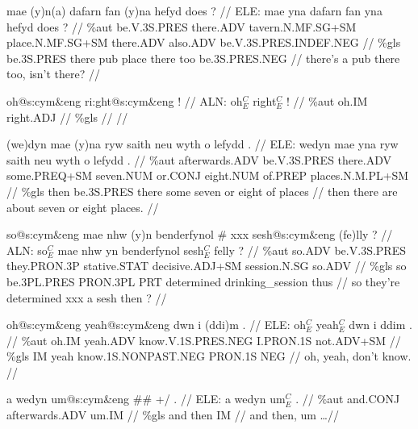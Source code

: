 \documentclass[a4paper,10pt]{article}
\begin{document}
\ex
\begingl[lingstyle=gergl]
\glchat mae (y)n(a) dafarn fan (y)na hefyd does ? //
\glsurface ELE:  mae yna dafarn fan yna hefyd does ?  //
\glauto \%aut  be{\scriptsize .V.3S.PRES} there{\scriptsize .ADV} tavern{\scriptsize .N.MF.SG+SM} place{\scriptsize .N.MF.SG+SM} there{\scriptsize .ADV} also{\scriptsize .ADV} be{\scriptsize .V.3S.PRES.INDEF.NEG}   //
\glmanual \%gls  be{\scriptsize .3S.PRES} there pub place there too be{\scriptsize .3S.PRES.NEG}   //
\gleng there's a pub there too, isn't there? //
\endgl
\xe

\ex
\begingl[lingstyle=gergl]
\glchat oh@s:cym\&eng ri:ght@s:cym\&eng ! //
\glsurface ALN:  oh$^{C}_{E}$ right$^{C}_{E}$ !  //
\glauto \%aut  oh{\scriptsize .IM} right{\scriptsize .ADJ}   //
\glmanual \%gls      //
\gleng  //
\endgl
\xe

\ex
\begingl[lingstyle=gergl]
\glchat (we)dyn mae (y)na ryw saith neu wyth o lefydd . //
\glsurface ELE:  wedyn mae yna ryw saith neu wyth o lefydd .  //
\glauto \%aut  afterwards{\scriptsize .ADV} be{\scriptsize .V.3S.PRES} there{\scriptsize .ADV} some{\scriptsize .PREQ+SM} seven{\scriptsize .NUM} or{\scriptsize .CONJ} eight{\scriptsize .NUM} of{\scriptsize .PREP} places{\scriptsize .N.M.PL+SM}   //
\glmanual \%gls  then be{\scriptsize .3S.PRES} there some seven or eight of places   //
\gleng then there are about seven or eight places. //
\endgl
\xe

\ex
\begingl[lingstyle=gergl]
\glchat so@s:cym\&eng mae nhw (y)n benderfynol \# xxx sesh@s:cym\&eng (fe)lly ? //
\glsurface ALN:  so$^{C}_{E}$ mae nhw yn benderfynol sesh$^{C}_{E}$ felly ?  //
\glauto \%aut  so{\scriptsize .ADV} be{\scriptsize .V.3S.PRES} they{\scriptsize .PRON.3P} stative{\scriptsize .STAT} decisive{\scriptsize .ADJ+SM} session{\scriptsize .N.SG} so{\scriptsize .ADV}   //
\glmanual \%gls  so be{\scriptsize .3PL.PRES} PRON{\scriptsize .3PL} PRT determined drinking\_session thus   //
\gleng so they're determined xxx a sesh then ? //
\endgl
\xe

\ex
\begingl[lingstyle=gergl]
\glchat oh@s:cym\&eng yeah@s:cym\&eng dwn i (ddi)m . //
\glsurface ELE:  oh$^{C}_{E}$ yeah$^{C}_{E}$ dwn i ddim .  //
\glauto \%aut  oh{\scriptsize .IM} yeah{\scriptsize .ADV} know{\scriptsize .V.1S.PRES.NEG} I{\scriptsize .PRON.1S} not{\scriptsize .ADV+SM}   //
\glmanual \%gls  IM yeah know{\scriptsize .1S.NONPAST.NEG} PRON{\scriptsize .1S} NEG   //
\gleng oh, yeah, don't know. //
\endgl
\xe

\ex
\begingl[lingstyle=gergl]
\glchat a wedyn um@s:cym\&eng \#\# +/ . //
\glsurface ELE:  a wedyn um$^{C}_{E}$ .  //
\glauto \%aut  and{\scriptsize .CONJ} afterwards{\scriptsize .ADV} um{\scriptsize .IM}   //
\glmanual \%gls  and then IM   //
\gleng and then, um \dots  //
\endgl
\xe
\end{document}
